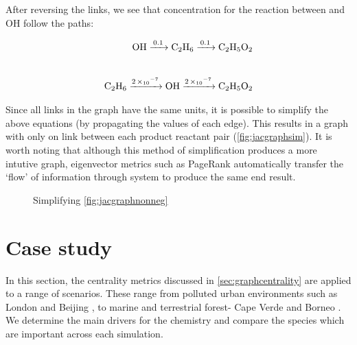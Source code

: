 After reversing the links, we see that concentration for the reaction between  and OH follow the paths: 

\begin{eqnarray}
    \ce{OH ->[0.1] C2H6 ->[0.1] C2H5O2} \\[20pt]
    \ce{C2H6 ->[2\times10^{-7}] OH ->[2\times10^{-7}] C2H5O2}
\end{eqnarray}

Since all links in the graph have the same units, it is possible to simplify the above equations (by propagating the values of each edge).  This results in a graph with only on link between each product reactant pair (\autoref{fig:jacgraphsim}). It is worth noting that although this method of simplification produces a more intutive graph, eigenvector metrics such as PageRank automatically transfer the `flow' of information through system to produce the same end result.

\begin{figure}[H]
\begin{center}

\end{center}

\caption{ Simplifying \autoref{fig:jacgraphnonneg}}
\label{fig:jacgraphsim}
\end{figure}


\section{Case study}\label{sec:metriccase}
In this section, the centrality metrics discussed in \autoref{sec:graphcentrality} are applied to a range of scenarios. These range from polluted urban environments such as London \citep{clfo} and Beijing \cite{aphh}, to marine and terrestrial forest- Cape Verde \cite{capeverde} and Borneo \citep{borneo}. We determine the main drivers for the chemistry and compare the species which are important across each simulation.  

